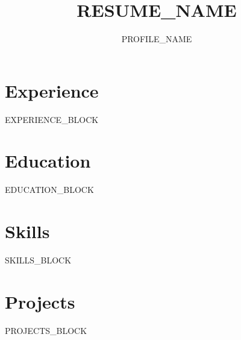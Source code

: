 \documentclass[11pt]{article}
\title{RESUME_NAME}
\author{PROFILE_NAME}
\date{}
\begin{document}
\maketitle

\section{Experience}
EXPERIENCE_BLOCK

\section{Education}
EDUCATION_BLOCK

\section{Skills}
SKILLS_BLOCK

\section{Projects}
PROJECTS_BLOCK
\end{document}

